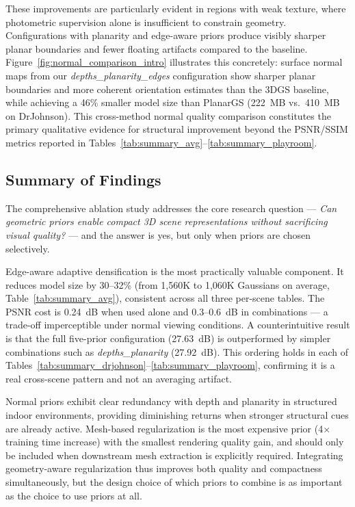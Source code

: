 These improvements are particularly evident in regions with weak texture, where photometric supervision alone is insufficient to constrain geometry. Configurations with planarity and edge-aware priors produce visibly sharper planar boundaries and fewer floating artifacts compared to the baseline. Figure~\ref{fig:normal_comparison_intro} illustrates this concretely: surface normal maps from our \textit{depths\_\allowbreak planarity\_\allowbreak edges} configuration show sharper planar boundaries and more coherent orientation estimates than the 3DGS baseline, while achieving a 46\% smaller model size than PlanarGS (222~MB vs.\ 410~MB on DrJohnson). This cross-method normal quality comparison constitutes the primary qualitative evidence for structural improvement beyond the PSNR/SSIM metrics reported in Tables~\ref{tab:summary_avg}--\ref{tab:summary_playroom}.

\subsection{Summary of Findings}

The comprehensive ablation study addresses the core research question — \textit{Can geometric priors enable compact 3D scene representations without sacrificing visual quality?} — and the answer is yes, but only when priors are chosen selectively.

Edge-aware adaptive densification is the most practically valuable component. It reduces model size by 30--32\% (from 1{,}560K to 1{,}060K Gaussians on average, Table~\ref{tab:summary_avg}), consistent across all three per-scene tables. The PSNR cost is 0.24~dB when used alone and 0.3--0.6~dB in combinations — a trade-off imperceptible under normal viewing conditions. A counterintuitive result is that the full five-prior configuration (27.63~dB) is outperformed by simpler combinations such as \textit{depths\_\allowbreak planarity} (27.92~dB). This ordering holds in each of Tables~\ref{tab:summary_drjohnson}--\ref{tab:summary_playroom}, confirming it is a real cross-scene pattern and not an averaging artifact.

Normal priors exhibit clear redundancy with depth and planarity in structured indoor environments, providing diminishing returns when stronger structural cues are already active. Mesh-based regularization is the most expensive prior (4$\times$ training time increase) with the smallest rendering quality gain, and should only be included when downstream mesh extraction is explicitly required. Integrating geometry-aware regularization thus improves both quality and compactness simultaneously, but the design choice of which priors to combine is as important as the choice to use priors at all.